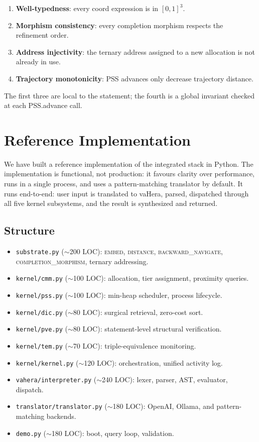 \documentclass[11pt,twocolumn,a4paper]{article}
\begin{document}
\begin{enumerate}[leftmargin=*]
\item \textbf{Well-typedness}: every coord expression is in $[0,1]^3$.
\item \textbf{Morphism consistency}: every completion morphism respects the refinement order.
\item \textbf{Address injectivity}: the ternary address assigned to a new allocation is not already in use.
\item \textbf{Trajectory monotonicity}: PSS advances only decrease trajectory distance.
\end{enumerate}

The first three are local to the statement; the fourth is a global invariant checked at each PSS.advance call.


\section{Reference Implementation}
\label{sec:implementation}

We have built a reference implementation of the integrated stack in Python. The implementation is functional, not production: it favours clarity over performance, runs in a single process, and uses a pattern-matching translator by default. It runs end-to-end: user input is translated to vaHera, parsed, dispatched through all five kernel subsystems, and the result is synthesized and returned.

\subsection{Structure}

\begin{itemize}[leftmargin=*]
\item \texttt{substrate.py} ($\sim$200 LOC): \textsc{embed}, \textsc{distance}, \textsc{backward\_navigate}, \textsc{completion\_morphism}, ternary addressing.
\item \texttt{kernel/cmm.py} ($\sim$100 LOC): allocation, tier assignment, proximity queries.
\item \texttt{kernel/pss.py} ($\sim$100 LOC): min-heap scheduler, process lifecycle.
\item \texttt{kernel/dic.py} ($\sim$80 LOC): surgical retrieval, zero-cost sort.
\item \texttt{kernel/pve.py} ($\sim$80 LOC): statement-level structural verification.
\item \texttt{kernel/tem.py} ($\sim$70 LOC): triple-equivalence monitoring.
\item \texttt{kernel/kernel.py} ($\sim$120 LOC): orchestration, unified activity log.
\item \texttt{vahera/interpreter.py} ($\sim$240 LOC): lexer, parser, AST, evaluator, dispatch.
\item \texttt{translator/translator.py} ($\sim$180 LOC): OpenAI, Ollama, and pattern-matching backends.
\item \texttt{demo.py} ($\sim$180 LOC): boot, query loop, validation.
\end{itemize}
\end{document}
